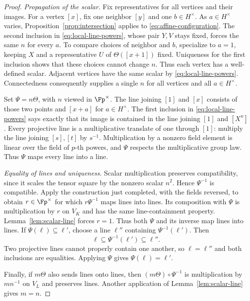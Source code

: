 \begin{proof}
\smallskip
\noindent\emph{Propagation of the scalar.}
Fix representatives for all vertices and their images.  For a vertex
$[x]$, fix one neighbor $[y]$ and one $b\in H^\times$.  As
$a\in H^\times$ varies, Proposition~\ref{prop:intersection} applies
to \eqref{eq:affine-configuration}.  The second inclusion in
\eqref{eq:local-line-powers}, whose pair $Y,V$ stays fixed, forces
the same $n$ for every $a$.  To compare choices of neighbor and $b$,
specialize to $a=1$, keeping $X$ and a representative $U$ of
$\Theta([x+1])$ fixed.  Uniqueness for the first inclusion shows that
these choices cannot change $n$.  Thus each vertex has a
well-defined scalar.  Adjacent vertices have the same scalar by
\eqref{eq:local-line-powers}.  Connectedness consequently supplies a
single $n$ for all vertices and all $a\in H^\times$.

Set $\Psi=n\Theta$, with $n$ viewed in $\Fp^\times$.
The line joining $[1]$ and $[x]$ consists of those two points and
$[x+a]$ for $a\in H^\times$.  The first inclusion in
\eqref{eq:local-line-powers} says exactly that its image is contained
in the line joining $[1]$ and $[X^n]$.  Every projective line is a
multiplicative translate of one through $[1]$: multiply the line
joining $[s],[t]$ by $s^{-1}$.  Multiplication by a nonzero field
element is linear over the field of $p$-th powers, and $\Psi$ respects
the multiplicative group law.  Thus $\Psi$ maps every line into a line.

\smallskip
\noindent\emph{Equality of lines and uniqueness.}
Scalar multiplication preserves compatibility, since it scales the
tensor square by the nonzero scalar $n^2$.  Hence $\Psi^{-1}$ is
compatible.  Apply the construction just completed, with the fields
reversed, to obtain $r\in\Fp^\times$ for which $r\Psi^{-1}$ maps
lines into lines.  Its composition with $\Psi$ is multiplication
by $r$ on $V_K$ and has the same line-containment property.
Lemma~\ref{lem:scalar-line} forces $r=1$.
Thus both $\Psi$ and its inverse map lines into lines.  If
$\Psi(\ell)\subseteq\ell'$, choose a line $\ell''$ containing
$\Psi^{-1}(\ell')$.  Then
\[
 \ell\subseteq\Psi^{-1}(\ell')\subseteq\ell''.
\]
Two projective lines cannot properly contain one another, so
$\ell=\ell''$ and both inclusions are equalities.  Applying $\Psi$
gives $\Psi(\ell)=\ell'$.

Finally, if $m\Theta$ also sends lines onto lines, then
$(m\Theta)\circ\Psi^{-1}$ is multiplication by $mn^{-1}$ on
$V_L$ and preserves lines.  Another application of
Lemma~\ref{lem:scalar-line} gives $m=n$.
\end{proof}
